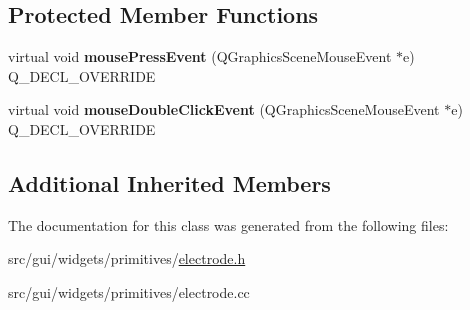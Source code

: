 \subsection*{Protected Member Functions}
\begin{DoxyCompactItemize}
\item 
virtual void {\bfseries mouse\+Press\+Event} (Q\+Graphics\+Scene\+Mouse\+Event $\ast$e) Q\+\_\+\+D\+E\+C\+L\+\_\+\+O\+V\+E\+R\+R\+I\+DE\hypertarget{classprim_1_1Electrode_a935a6b74faadff87ba042fdb3ed66f6a}{}\label{classprim_1_1Electrode_a935a6b74faadff87ba042fdb3ed66f6a}

\item 
virtual void {\bfseries mouse\+Double\+Click\+Event} (Q\+Graphics\+Scene\+Mouse\+Event $\ast$e) Q\+\_\+\+D\+E\+C\+L\+\_\+\+O\+V\+E\+R\+R\+I\+DE\hypertarget{classprim_1_1Electrode_ad60d17ededd7096d18087432fdb68e9f}{}\label{classprim_1_1Electrode_ad60d17ededd7096d18087432fdb68e9f}

\end{DoxyCompactItemize}
\subsection*{Additional Inherited Members}


The documentation for this class was generated from the following files\+:\begin{DoxyCompactItemize}
\item 
src/gui/widgets/primitives/\hyperlink{electrode_8h}{electrode.\+h}\item 
src/gui/widgets/primitives/electrode.\+cc\end{DoxyCompactItemize}
